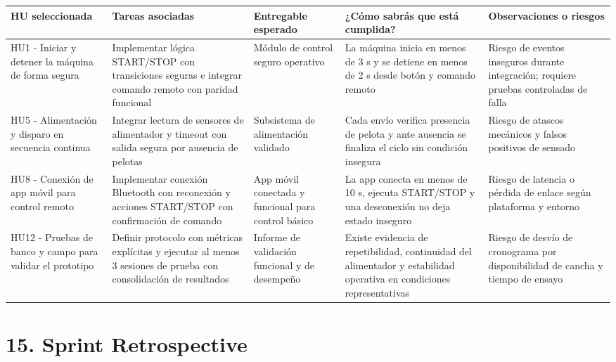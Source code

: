 ﻿\documentclass[
11pt, %
]{charter}
\begin{document}
\begin{table}[htpb]
\small
\renewcommand{\arraystretch}{1.25}
\begin{tabular}{|>{\raggedright\arraybackslash}m{2.4cm}|
                >{\raggedright\arraybackslash}m{2.3cm}|
                >{\raggedright\arraybackslash}m{3cm}|
                >{\raggedright\arraybackslash}m{3cm}|
                >{\raggedright\arraybackslash}m{3cm}|}
\hline
\rowcolor[HTML]{CCCCCC}
\textbf{HU seleccionada} & \textbf{Tareas asociadas} & \textbf{Entregable esperado} & \textbf{¿Cómo sabrás que está cumplida?} & \textbf{Observaciones o riesgos} \\
\hline
HU1 - Iniciar y detener la máquina de forma segura & Implementar lógica START/STOP con transiciones seguras e integrar comando remoto con paridad funcional & Módulo de control seguro operativo & La máquina inicia en menos de 3 s y se detiene en menos de 2 s desde botón y comando remoto & Riesgo de eventos inseguros durante integración; requiere pruebas controladas de falla \\
\hline
HU5 - Alimentación y disparo en secuencia continua & Integrar lectura de sensores de alimentador y timeout con salida segura por ausencia de pelotas & Subsistema de alimentación validado & Cada envío verifica presencia de pelota y ante ausencia se finaliza el ciclo sin condición insegura & Riesgo de atascos mecánicos y falsos positivos de sensado \\
\hline
HU8 - Conexión de app móvil para control remoto & Implementar conexión Bluetooth con reconexión y acciones START/STOP con confirmación de comando & App móvil conectada y funcional para control básico & La app conecta en menos de 10 s, ejecuta START/STOP y una desconexión no deja estado inseguro & Riesgo de latencia o pérdida de enlace según plataforma y entorno \\
\hline
HU12 - Pruebas de banco y campo para validar el prototipo & Definir protocolo con métricas explícitas y ejecutar al menos 3 sesiones de prueba con consolidación de resultados & Informe de validación funcional y de desempeño & Existe evidencia de repetibilidad, continuidad del alimentador y estabilidad operativa en condiciones representativas & Riesgo de desvío de cronograma por disponibilidad de cancha y tiempo de ensayo \\
\hline
\end{tabular}
\end{table}

\newpage
\section{15. Sprint Retrospective}    
\label{sec:sprint_retro}
\end{document}
